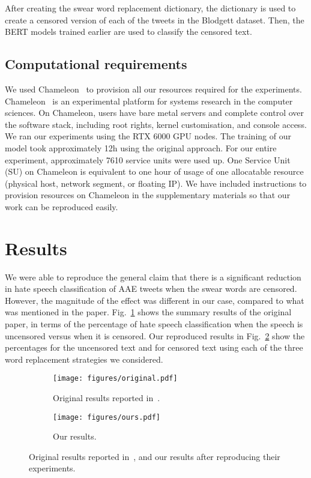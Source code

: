 After creating the swear word replacement dictionary, the dictionary is used to create a censored version of each of the tweets in the Blodgett dataset. Then, the BERT models trained earlier are used to classify the censored text.

\subsection{Computational requirements}

We used Chameleon~\cite{chameleon} to provision all our resources required for the experiments. Chameleon~\cite{chameleon} is an experimental platform for systems research in the computer sciences. On Chameleon, users have bare metal servers and complete control over the software stack, including root rights, kernel customisation, and console access. We ran our experiments using the RTX 6000 GPU nodes. The training of our model took approximately 12h using the original approach.  For our entire experiment, approximately 7610 service units were used up. One Service Unit (SU) on Chameleon is equivalent to one hour of usage of one allocatable resource (physical host, network segment, or floating IP). We have included instructions to provision resources on Chameleon in the supplementary materials so that our work can be reproduced easily.

\section{Results}
\label{sec:results}

We were able to reproduce the general claim that there is a significant reduction in hate speech classification of AAE tweets when the swear words are censored. However, the magnitude of the effect was different in our case, compared to what was mentioned in the paper.  Fig.~\ref{fig:original} shows the summary results of the original paper, in terms of the percentage of hate speech classification when the speech is uncensored versus when it is censored. Our reproduced results in Fig.~\ref{fig:ours} show the percentages for the uncensored text and for censored text using each of the three word replacement strategies we considered.

\begin{figure}[t]
     \centering
     \begin{subfigure}[b]{0.47\textwidth}
         \centering
         \texttt{[image: figures/original.pdf]}
         \caption{Original results reported in~\cite{aae_paper}.}
         \label{fig:original}
     \end{subfigure}
     \hfill
     \begin{subfigure}[b]{0.47\textwidth}
         \centering
         \texttt{[image: figures/ours.pdf]}
         \caption{Our results.}
         \label{fig:ours}
     \end{subfigure}
        \caption{Original results reported in~\cite{aae_paper}, and our results after reproducing their experiments.}
        \label{fig:results}
\end{figure}


